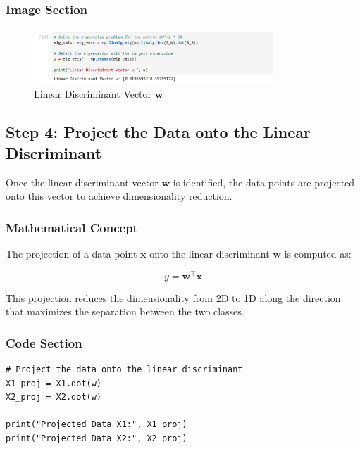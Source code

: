\documentclass{exam}
\begin{document}
\subsubsection*{Image Section}

\begin{figure}[h!]
    \centering
    \includegraphics[width=0.8\textwidth]{images/lda_vector.png}
    \caption{Linear Discriminant Vector \( \mathbf{w} \)}
    \label{fig:lda_vector}
\end{figure}

\newpage

\subsection{Step 4: Project the Data onto the Linear Discriminant}

Once the linear discriminant vector \( \mathbf{w} \) is identified, the data points are projected onto this vector to achieve dimensionality reduction.

\subsubsection*{Mathematical Concept}

The projection of a data point \( \mathbf{x} \) onto the linear discriminant \( \mathbf{w} \) is computed as:

\[
y = \mathbf{w}^\top \mathbf{x}
\]

This projection reduces the dimensionality from 2D to 1D along the direction that maximizes the separation between the two classes.

\subsubsection*{Code Section}

\begin{verbatim}
# Project the data onto the linear discriminant
X1_proj = X1.dot(w)
X2_proj = X2.dot(w)

print("Projected Data X1:", X1_proj)
print("Projected Data X2:", X2_proj)
\end{verbatim}
\end{document}
